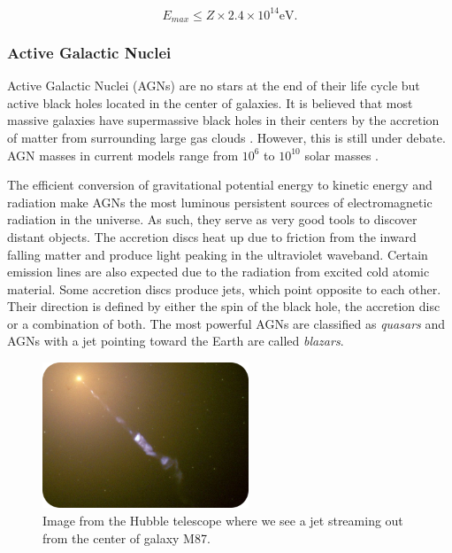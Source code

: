 \begin{equation}
E_{max} \leq Z \times 2.4 \times 10^{14} \textrm{eV}.
\end{equation}

\subsubsection{Active Galactic Nuclei}
\label{subsubsec:agn}
Active Galactic Nuclei (AGNs) are no stars at the end of their life cycle but active black holes located in the center of galaxies. It is believed that most massive galaxies have supermassive black holes in their centers by the accretion of matter from surrounding large gas clouds \cite{Urry:1995mg,Antonucci:1993sg}. However, this is still under debate. AGN masses in current models range from $10^6$ to $10^{10}$ solar masses \cite{Kazanas:2012sk}.

The efficient conversion of gravitational potential energy to kinetic energy and radiation make AGNs the most luminous persistent sources of electromagnetic radiation in the universe. As such, they serve as very good tools to discover distant objects. The accretion discs heat up due to friction from the inward falling matter and produce light peaking in the ultraviolet waveband. Certain emission lines are also expected due to the radiation from excited cold atomic material. Some accretion discs produce jets, which point opposite to each other. Their direction is defined by either the spin of the black hole, the accretion disc or a combination of both.  The most powerful AGNs are classified as \textit{quasars} and AGNs with a jet pointing toward the Earth are called \textit{blazars}.

\begin{figure}
\centering
\includegraphics[width=0.55\textwidth]{chapter3/img/jet_crop_rounded.jpg}
\caption{
Image from the Hubble telescope where we see a jet streaming out from the center of galaxy M87.}
\end{figure}


